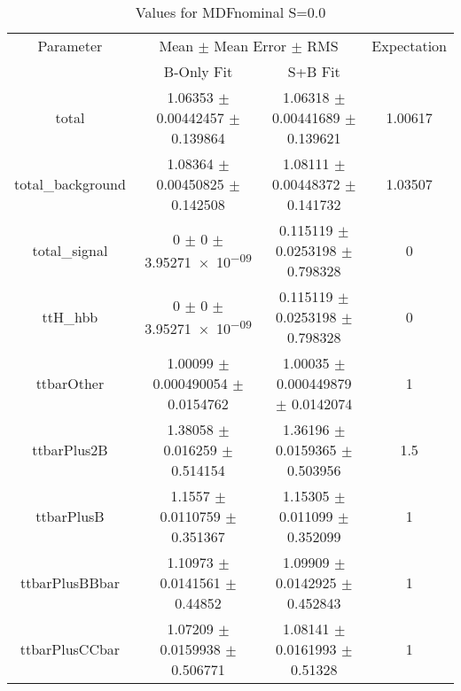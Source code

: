 \begin{table}
\centering
\caption{Values for MDFnominal S=0.0}
\begin{tabular}{cccc}
\toprule
Parameter & \multicolumn{2}{c}{Mean $\pm$ Mean Error $\pm$ RMS} & Expectation\\
 & B-Only Fit & S+B Fit & \\
\midrule
total & \num{1.06353} $\pm$ \num{0.00442457} $\pm$ \num{0.139864} & \num{1.06318} $\pm$ \num{0.00441689} $\pm$ \num{0.139621} & \num{1.00617}\\
total\_background & \num{1.08364} $\pm$ \num{0.00450825} $\pm$ \num{0.142508} & \num{1.08111} $\pm$ \num{0.00448372} $\pm$ \num{0.141732} & \num{1.03507}\\
total\_signal & \num{0} $\pm$ \num{0} $\pm$ \num{3.95271e-09} & \num{0.115119} $\pm$ \num{0.0253198} $\pm$ \num{0.798328} & \num{0}\\
ttH\_hbb & \num{0} $\pm$ \num{0} $\pm$ \num{3.95271e-09} & \num{0.115119} $\pm$ \num{0.0253198} $\pm$ \num{0.798328} & \num{0}\\
ttbarOther & \num{1.00099} $\pm$ \num{0.000490054} $\pm$ \num{0.0154762} & \num{1.00035} $\pm$ \num{0.000449879} $\pm$ \num{0.0142074} & \num{1}\\
ttbarPlus2B & \num{1.38058} $\pm$ \num{0.016259} $\pm$ \num{0.514154} & \num{1.36196} $\pm$ \num{0.0159365} $\pm$ \num{0.503956} & \num{1.5}\\
ttbarPlusB & \num{1.1557} $\pm$ \num{0.0110759} $\pm$ \num{0.351367} & \num{1.15305} $\pm$ \num{0.011099} $\pm$ \num{0.352099} & \num{1}\\
ttbarPlusBBbar & \num{1.10973} $\pm$ \num{0.0141561} $\pm$ \num{0.44852} & \num{1.09909} $\pm$ \num{0.0142925} $\pm$ \num{0.452843} & \num{1}\\
ttbarPlusCCbar & \num{1.07209} $\pm$ \num{0.0159938} $\pm$ \num{0.506771} & \num{1.08141} $\pm$ \num{0.0161993} $\pm$ \num{0.51328} & \num{1}\\
\bottomrule
\end{tabular}
\end{table}